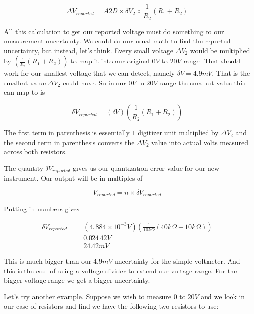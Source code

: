 \begin{equation*}
	\Delta V_{reported}=A2D\times \delta V_{2}\times \frac{1}{R_{2}}\left(R_{1}+R_{2}\right)
\end{equation*}

All this calculation to get our reported voltage must do something to our measurement uncertainty. We could do our usual math to find the reported uncertainty, but instead, let's think. Every small voltage $\Delta V_{2}$ would be multiplied by $\left( \frac{1}{R_{2}}\left( R_{1}+R_{2}\right) \right) $ to map it into our original $0\unit{V}$ to $20\unit{V}$ range. That should work for our smallest voltage that we can detect, namely $\delta V=4.9\unit{mV}.$ That is the smallest value $\Delta V_{2}$ could have. So in our $0\unit{V}$ to $20\unit{V}$ range the smallest value this can map to is  

\begin{equation*}
	\delta V_{reported}=\left( \delta V\right) \left( \frac{1}{R_{2}}\left(R_{1}+R_{2}\right) \right)
\end{equation*}

The first term in parenthesis is essentially $1$ digitizer unit multiplied by $\Delta V_{2}$ and the second term in parenthesis converts the $\Delta V_{2}$ value into actual volts measured across both resistors.

The quantity $\delta V_{reported}$ gives us our quantization error value for our new instrument. Our output will be in multiples of 

\begin{equation*}
	V_{reported}=n\times \delta V_{reported}
\end{equation*}

\noindent Putting in numbers gives 

\begin{eqnarray*}
	\delta V_{reported} &=&\left( 4.\,\allowbreak 884\times 10^{-3}\unit{V} \right) \left( \frac{1}{10\unit{k\Omega}}\left( 40\unit{k\Omega}+10\unit{k\Omega}\right) \right) \\
                        &=&0.024\,42\unit{V} \\
                        &=&24.42\unit{mV}
\end{eqnarray*}

This is much bigger than our $4.9\unit{mV}$ uncertainty for the simple voltmeter. And this is the cost of using a voltage divider to extend our voltage range. For the bigger voltage range we get a bigger uncertainty.

Let's try another example. Suppose we wish to measure $0$ to $20\unit{V}$ and we look in our case of resistors and find we have the following two resistors to use:

